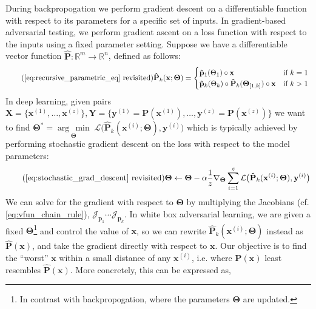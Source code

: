 \documentclass[12pt,initial,twoside,maitrise]{dms}
\newcommand{\argmin}[1]{\underset{#1}{\operatorname{arg}\,\operatorname{min}}\;}
\numberwithin{equation}{section}
\numberwithin{table}{chapter}
\numberwithin{figure}{chapter}
\begin{document}
During backpropogation we perform gradient descent on a differentiable function with respect to its parameters for a specific set of inputs. In gradient-based adversarial testing, we perform gradient ascent on a loss function with respect to the inputs using a fixed parameter setting. Suppose we have a differentiable vector function $\mathbf{\hat P}: \mathbb{R}^m\rightarrow\mathbb{R}^n$, defined as follows:
%
\begin{equation} \tag{\autoref{eq:recursive_parametric_eq} revisited}
    \mathbf{\hat P}_k(\mathbf{x}; \mathbf{\Theta}) = \begin{cases} \mathbf{\hat p}_1(\Theta_1)\circ\mathbf{x} &\text{if } k=1\\ \mathbf{\hat p}_k(\Theta_k)\circ \mathbf{\hat P}_{k}(\mathbf{\Theta}_{[1, k]})\circ\mathbf{x}&\text{if } k > 1 \end{cases} \\
\end{equation}
%
In deep learning, given pairs $\mathbf{X} = \{\mathbf{x}^{(1)}, \dots, \mathbf{x}^{(z)}\}, \mathbf{Y} = \{\mathbf{y}^{(1)} = \mathbf{P}(\mathbf{x}^{(1)}), \dots, \mathbf{y}^{(z)} = \mathbf{P}(\mathbf{x}^{(z)})\}$ we want to find $\mathbf{\Theta}^* = \argmin{\boldsymbol{\Theta}}\mathcal{L}\big(\mathbf{\hat P}_k(\mathbf{x}^{(i)}; \mathbf{\Theta}), \mathbf{y}^{(i)}\big)$ which is typically achieved by performing stochastic gradient descent on the loss with respect to the model parameters:
%
\begin{equation} \tag{\autoref{eq:stochastic_grad_descent} revisited}
    \mathbf\Theta \leftarrow \mathbf\Theta - \alpha\frac{1}{z}\nabla_{\mathbf\Theta} \sum_{i=1}^z\mathcal{L}\big(\mathbf{\hat P}_k(\mathbf{x}^{(i)}; \mathbf{\Theta}), \mathbf{y}^{(i)}\big)
\end{equation}
%
We can solve for the gradient with respect to $\mathbf{\Theta}$ by multiplying the Jacobians (cf. \autoref{eq:vfun_chain_rule}), $\mathcal{J}_{\mathbf{p}_1} \cdots \mathcal{J}_{\mathbf{p}_k}$. In white box adversarial learning, we are given a fixed $\mathbf \Theta$\footnote{In contrast with backpropogation, where the parameters $\mathbf\Theta$ are updated.} and control the value of $\mathbf x$, so we can rewrite $\mathbf{\hat P}_k(\mathbf{x}^{(i)};\mathbf\Theta)$ instead as $\mathbf{\hat P}(\mathbf x)$, and take the gradient directly with respect to $\mathbf x$. Our objective is to find the ``worst'' $\mathbf x$ within a small distance of any $\mathbf x^{(i)}$, i.e. where $\mathbf{P}(\mathbf x)$ least resembles $\mathbf{\hat P}(\mathbf x)$. More concretely, this can be expressed as,
\end{document}
